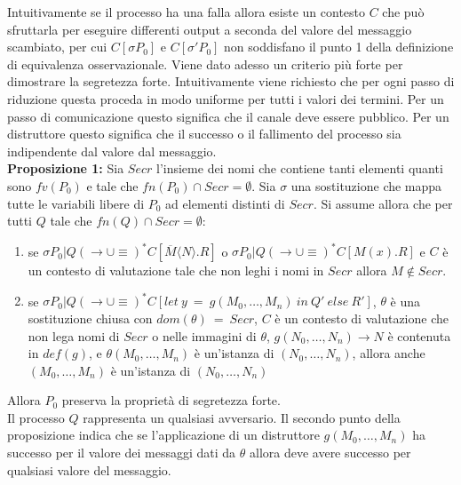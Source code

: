 \documentclass[12pt]{article}
\begin{document}
Intuitivamente se il processo ha una falla allora esiste un contesto $C$ che può sfruttarla per eseguire differenti output a seconda del valore del messaggio scambiato, per cui $C[\sigma P_0]$ e $C[\sigma' P_0]$ non soddisfano il punto 1 della definizione di equivalenza osservazionale. Viene dato adesso un criterio più forte per dimostrare la segretezza forte. Intuitivamente viene richiesto che per ogni passo di riduzione questa proceda in modo uniforme per tutti i valori dei termini. Per un passo di comunicazione questo significa che il canale deve essere pubblico. Per un distruttore questo significa che il successo o il fallimento del processo sia indipendente dal valore dal messaggio.\\

\textbf{Proposizione 1:} Sia $Secr$ l'insieme dei nomi che contiene tanti elementi quanti sono $fv(P_0)$  e tale che $fn(P_0) \cap Secr = \emptyset$. Sia $\sigma$ una sostituzione che mappa tutte le variabili libere di $P_0$ ad elementi distinti di $Secr$. Si assume allora che per tutti $Q$ tale che $fn(Q) \cap Secr = \emptyset$:
\begin{enumerate}
    \item se $\sigma P_0 | Q (\rightarrow \cup \equiv)^* C[\overline{M} \langle N \rangle . R]$ o $\sigma P_0 | Q (\rightarrow \cup \equiv)^* C[M(x).R]$ e $C$ è un contesto di valutazione tale che non leghi i nomi in $Secr$ allora $M \notin Secr$.
    
    \item se $\sigma P_0 | Q (\rightarrow \cup \equiv)^* C[let\ y\ =\ g(M_0,\dots,M_n)\ in\ Q'\ else\ R']$, $\theta$ è una sostituzione chiusa con $dom(\theta)\ =\ Secr$, $C$ è un contesto di valutazione che non lega nomi di $Secr$ o nelle immagini di $\theta$, $g(N_0,\dots,N_n) \rightarrow N$ è contenuta in $def(g)$, e $\theta (M_0,\dots,M_n)$ è un'istanza di $(N_0,\dots,N_n)$, allora anche $(M_0,\dots,M_n)$ è un'istanza di $(N_0,\dots,N_n)$   
\end{enumerate}
Allora $P_0$ preserva la proprietà di segretezza forte.\\

Il processo $Q$ rappresenta un qualsiasi avversario. Il secondo punto della proposizione indica che se l'applicazione di un distruttore $g(M_0,\dots,M_n)$ ha successo per il valore dei messaggi dati da $\theta$ allora deve avere successo per qualsiasi valore del messaggio.\\ 
\end{document}
